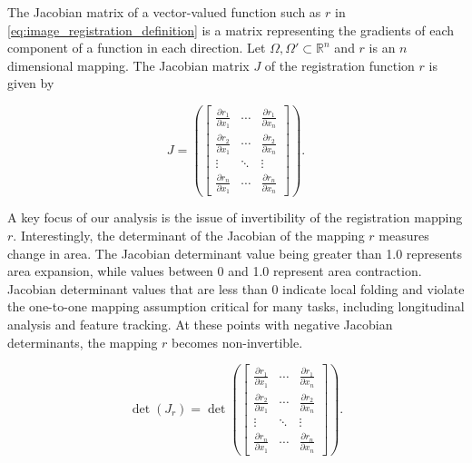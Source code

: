 The Jacobian matrix of a vector-valued function such as $r$ in \autoref{eq:image_registration_definition} is a matrix representing the gradients of each component of a function in each direction. 
Let $\Omega, \Omega' \subset \mathbb{R}^n$ and $r$ is an $n$ dimensional mapping. The Jacobian matrix $J$ of the registration function $r$ is given by

\begin{equation} \label{eq:general_jacobian_matrix}
    J = 
    \left( 
        \begin{bmatrix}
            \frac{\partial r_1}{\partial x_1} & \cdots & \frac{\partial r_1}{\partial x_n} \\
            \frac{\partial r_2}{\partial x_1} & \cdots & \frac{\partial r_2}{\partial x_n} \\
            \vdots & \ddots & \vdots \\
            \frac{\partial r_n}{\partial x_1} & \cdots & \frac{\partial r_n}{\partial x_n}
        \end{bmatrix}
    \right).
\end{equation}

A key focus of our analysis is the issue of invertibility of the registration mapping $r$. Interestingly, the determinant of the Jacobian of the mapping $r$ measures change in area. The Jacobian determinant value being greater than 1.0 represents area expansion, while values between 0 and 1.0 represent area contraction. Jacobian determinant values that are less than 0 indicate local folding and violate the one-to-one mapping assumption critical for many tasks, including longitudinal analysis and feature tracking. At these points with negative Jacobian determinants, the mapping $r$ becomes non-invertible.


\begin{equation} \label{eq:general_jacobian_matrix_det}
    \det(J_r) = 
    \det\left( 
        \begin{bmatrix}
            \frac{\partial r_1}{\partial x_1} & \cdots & \frac{\partial r_1}{\partial x_n} \\
            \frac{\partial r_2}{\partial x_1} & \cdots & \frac{\partial r_2}{\partial x_n} \\
            \vdots & \ddots & \vdots \\
            \frac{\partial r_n}{\partial x_1} & \cdots & \frac{\partial r_n}{\partial x_n}
        \end{bmatrix}
    \right).
\end{equation}

